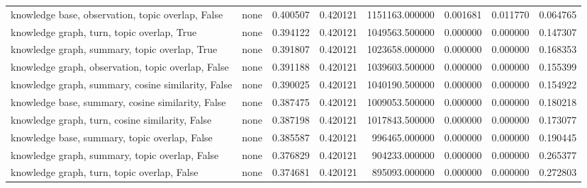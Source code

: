 \begin{tabular}{llrrrrrr}
knowledge base, observation, topic overlap, False & none & 0.400507 & 0.420121 & 1151163.000000 & 0.001681 & 0.011770 & 0.064765 \\
knowledge graph, turn, topic overlap, True & none & 0.394122 & 0.420121 & 1049563.500000 & 0.000000 & 0.000000 & 0.147307 \\
knowledge graph, summary, topic overlap, True & none & 0.391807 & 0.420121 & 1023658.000000 & 0.000000 & 0.000000 & 0.168353 \\
knowledge graph, observation, topic overlap, False & none & 0.391188 & 0.420121 & 1039603.500000 & 0.000000 & 0.000000 & 0.155399 \\
knowledge graph, summary, cosine similarity, False & none & 0.390025 & 0.420121 & 1040190.500000 & 0.000000 & 0.000000 & 0.154922 \\
knowledge base, summary, cosine similarity, False & none & 0.387475 & 0.420121 & 1009053.500000 & 0.000000 & 0.000000 & 0.180218 \\
knowledge graph, turn, cosine similarity, False & none & 0.387198 & 0.420121 & 1017843.500000 & 0.000000 & 0.000000 & 0.173077 \\
knowledge base, summary, topic overlap, False & none & 0.385587 & 0.420121 & 996465.000000 & 0.000000 & 0.000000 & 0.190445 \\
knowledge graph, summary, topic overlap, False & none & 0.376829 & 0.420121 & 904233.000000 & 0.000000 & 0.000000 & 0.265377 \\
knowledge graph, turn, topic overlap, False & none & 0.374681 & 0.420121 & 895093.000000 & 0.000000 & 0.000000 & 0.272803 \\
\bottomrule
\end{tabular}

